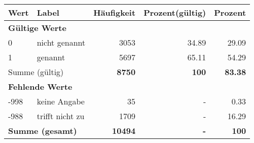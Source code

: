      \begin{longtable}{lXrrr}
     \toprule
     \textbf{Wert} & \textbf{Label} & \textbf{Häufigkeit} & \textbf{Prozent(gültig)} & \textbf{Prozent} \\
     \endhead
     \midrule
     \multicolumn{5}{l}{\textbf{Gültige Werte}}\\

     0 &
     \multicolumn{1}{X}{ nicht genannt   } &


       \num{3053} &
       \num[round-mode=places,round-precision=2]{34,89} &
         \num[round-mode=places,round-precision=2]{29,09} \\

     1 &
     \multicolumn{1}{X}{ genannt   } &


       \num{5697} &
       \num[round-mode=places,round-precision=2]{65,11} &
         \num[round-mode=places,round-precision=2]{54,29} \\
     \midrule
     \multicolumn{2}{l}{Summe (gültig)} &
       \textbf{\num{8750}} &
     \textbf{100} &
       \textbf{\num[round-mode=places,round-precision=2]{83,38}} \\
     \multicolumn{5}{l}{\textbf{Fehlende Werte}}\\
       -998 &
       keine Angabe &
         \num{35} &
        - &
         \num[round-mode=places,round-precision=2]{0,33} \\
       -988 &
       trifft nicht zu &
         \num{1709} &
        - &
         \num[round-mode=places,round-precision=2]{16,29} \\
     \midrule
     \multicolumn{2}{l}{\textbf{Summe (gesamt)}} &
          \textbf{\num{10494}} &
        \textbf{-} &
        \textbf{100} \\
     \bottomrule
     \end{longtable}
     
